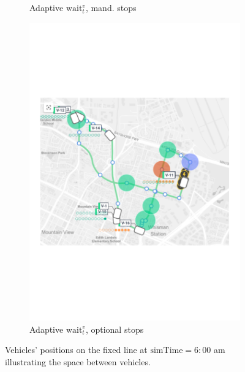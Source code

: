 \documentclass[12pt,a4paper]{article}
\begin{document}
\begin{figure}
\begin{subfigure}[b]{0.4\textwidth}
  \caption{Adaptive $\text{wait}_t^{v}$, mand. stops}
  \label{adaptive}
\end{subfigure}
\begin{subfigure}[b]{0.4\textwidth}
  \includegraphics[width=\linewidth]{./images/optionalstopsgroup.pdf}
  \caption{Adaptive $\text{wait}_t^{v}$, optional stops}
  \label{skip}
\end{subfigure}

\label{simustate}
\caption{Vehicles' positions on the fixed line at $\text{simTime} = 6:00$ am illustrating the space between vehicles.}
\end{figure}
\end{document}
